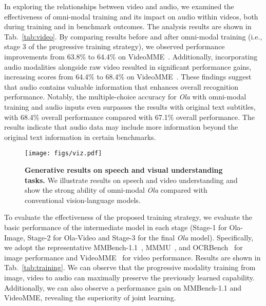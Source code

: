 In exploring the relationships between video and audio, we examined the effectiveness of omni-modal training and its impact on audio within videos, both during training and in benchmark outcomes. The analysis results are shown in Tab.~\ref{tab:video}.  By comparing results before and after omni-modal training (i.e., stage 3 of the progressive training strategy), we observed performance improvements from 63.8\% to 64.4\% on VideoMME~\citep{fu2024videomme}.  Additionally, incorporating audio modalities alongside raw video resulted in significant performance gains, increasing scores from 64.4\% to 68.4\% on VideoMME~\citep{fu2024videomme}. These findings suggest that audio contains valuable information that enhances overall recognition performance. Notably, the multiple-choice accuracy for \textit{Ola} with omni-modal training and audio inputs even surpasses the results with original text subtitles, with 68.4\% overall performance compared with 67.1\% overall performance. The results indicate that audio data may include more information beyond the original text information in certain benchmarks.

\begin{figure}[t]
\centering
\texttt{[image: figs/viz.pdf]}
\caption{\textbf{Generative results on speech and visual understanding tasks. }We illustrate results on speech and video understanding and show the strong ability of omni-modal \textit{Ola} compared with conventional vision-language models.}
\label{fig:showcase}
\end{figure}

To evaluate the effectiveness of the proposed training strategy, we evaluate the basic performance of the intermediate model in each stage (Stage-1 for Ola-Image, Stage-2 for Ola-Video and Stage-3 for the final \textit{Ola} model). Specifically, we adopt the representative MMBench-1.1~\citep{liu2023mmbench}, MMMU~\citep{yue2024mmmu}, and OCRBench~\citep{liu2023ocrbench} for image performance and VideoMME~\citep{fu2024videomme} for video performance. Results are shown in Tab.~\ref{tab:training}. We can observe that the progressive modality training from image, video to audio can maximally preserve the previously learned capability. Additionally, we can also observe a performance gain on MMBench-1.1 and VideoMME, revealing the superiority of joint learning. 


